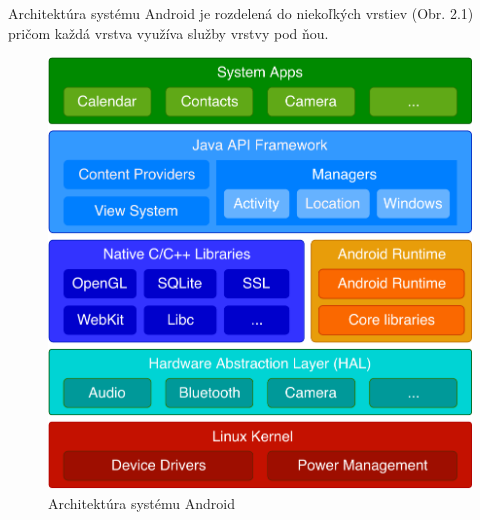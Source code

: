\documentclass{template/socthesis}
\begin{document}
Architektúra systému Android je rozdelená do niekoľkých vrstiev (Obr. 2.1) pričom každá vrstva využíva služby vrstvy pod ňou. 
\begin{center}
	\begin{figure}[htp]
		\centering
		\includegraphics[scale=0.80]{android_architecture}
		\caption{Architektúra systému Android}
	\end{figure}
\end{center}
\end{document}
